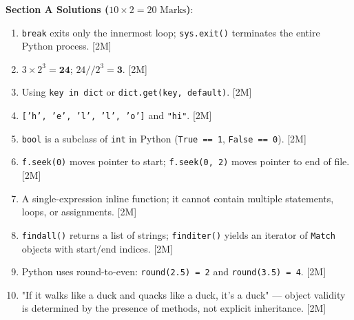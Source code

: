 \begin{solutionbox}
\noindent\textbf{Section A Solutions ($10 \times 2 = 20\text{ Marks}$)}:
\begin{enumerate}
    \item \texttt{break} exits only the innermost loop; \texttt{sys.exit()} terminates the entire Python process. [2M]
    \item $3 \times 2^3 = \mathbf{24}$; $24 // 2^3 = \mathbf{3}$. [2M]
    \item Using \texttt{key in dict} or \texttt{dict.get(key, default)}. [2M]
    \item \texttt{['h', 'e', 'l', 'l', 'o']} and \texttt{"hi"}. [2M]
    \item \texttt{bool} is a subclass of \texttt{int} in Python (\texttt{True == 1}, \texttt{False == 0}). [2M]
    \item \texttt{f.seek(0)} moves pointer to start; \texttt{f.seek(0, 2)} moves pointer to end of file. [2M]
    \item A single-expression inline function; it cannot contain multiple statements, loops, or assignments. [2M]
    \item \texttt{findall()} returns a list of strings; \texttt{finditer()} yields an iterator of \texttt{Match} objects with start/end indices. [2M]
    \item Python uses round-to-even: \texttt{round(2.5) = 2} and \texttt{round(3.5) = 4}. [2M]
    \item "If it walks like a duck and quacks like a duck, it's a duck" — object validity is determined by the presence of methods, not explicit inheritance. [2M]
\end{enumerate}


\end{solutionbox}
